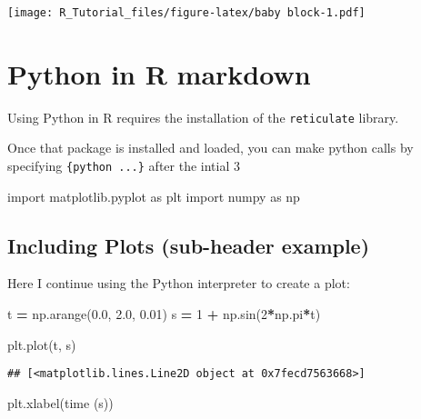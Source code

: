 \documentclass[
]{article}
\newenvironment{Shaded}{\begin{snugshade}}{\end{snugshade}}
\newcommand{\DecValTok}[1]{\textcolor[rgb]{0.00,0.00,0.81}{#1}}
\newcommand{\FloatTok}[1]{\textcolor[rgb]{0.00,0.00,0.81}{#1}}
\newcommand{\ImportTok}[1]{#1}
\newcommand{\NormalTok}[1]{#1}
\newcommand{\OperatorTok}[1]{\textcolor[rgb]{0.81,0.36,0.00}{\textbf{#1}}}
\newcommand{\StringTok}[1]{\textcolor[rgb]{0.31,0.60,0.02}{#1}}
\begin{document}
\texttt{[image: R\_Tutorial\_files/figure-latex/baby block-1.pdf]}

\hypertarget{python-in-r-markdown}{%
\section{Python in R markdown}\label{python-in-r-markdown}}

Using Python in R requires the installation of the \texttt{reticulate}
library.

Once that package is installed and loaded, you can make python calls by
specifying \texttt{\{python\ ...\}} after the intial 3

\begin{Shaded}
\begin{Highlighting}[]
\ImportTok{import}\NormalTok{ matplotlib.pyplot }\ImportTok{as}\NormalTok{ plt}
\ImportTok{import}\NormalTok{ numpy }\ImportTok{as}\NormalTok{ np}
\end{Highlighting}
\end{Shaded}

\hypertarget{including-plots-sub-header-example}{%
\subsection{Including Plots (sub-header
example)}\label{including-plots-sub-header-example}}

Here I continue using the Python interpreter to create a plot:

\begin{Shaded}
\begin{Highlighting}[]
\NormalTok{t }\OperatorTok{=}\NormalTok{ np.arange(}\FloatTok{0.0}\NormalTok{, }\FloatTok{2.0}\NormalTok{, }\FloatTok{0.01}\NormalTok{)}
\NormalTok{s }\OperatorTok{=} \DecValTok{1} \OperatorTok{+}\NormalTok{ np.sin(}\DecValTok{2}\OperatorTok{*}\NormalTok{np.pi}\OperatorTok{*}\NormalTok{t)}

\NormalTok{plt.plot(t, s)}
\end{Highlighting}
\end{Shaded}

\begin{verbatim}
## [<matplotlib.lines.Line2D object at 0x7fecd7563668>]
\end{verbatim}

\begin{Shaded}
\begin{Highlighting}[]
\NormalTok{plt.xlabel(}\StringTok{\textquotesingle{}time (s)\textquotesingle{}}\NormalTok{)}
\end{Highlighting}
\end{Shaded}
\end{document}
